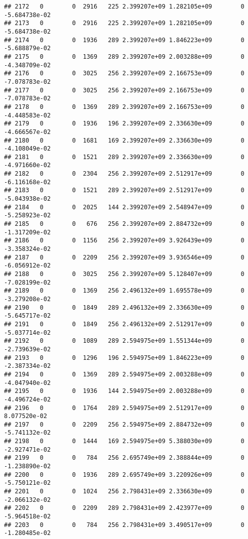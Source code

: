 \documentclass[
]{article}
\begin{document}
\begin{enumerate}
\begin{verbatim}
## 2172   0        0  2916   225 2.399207e+09 1.282105e+09        0 -5.684738e-02
## 2173   0        0  2916   225 2.399207e+09 1.282105e+09        0 -5.684738e-02
## 2174   0        0  1936   289 2.399207e+09 1.846223e+09        0 -5.688879e-02
## 2175   0        0  1369   289 2.399207e+09 2.003288e+09        0 -4.348709e-02
## 2176   0        0  3025   256 2.399207e+09 2.166753e+09        0 -7.078783e-02
## 2177   0        0  3025   256 2.399207e+09 2.166753e+09        0 -7.078783e-02
## 2178   0        0  1369   289 2.399207e+09 2.166753e+09        0 -4.448583e-02
## 2179   0        0  1936   196 2.399207e+09 2.336630e+09        0 -4.666567e-02
## 2180   0        0  1681   169 2.399207e+09 2.336630e+09        0 -4.108049e-02
## 2181   0        0  1521   289 2.399207e+09 2.336630e+09        0 -4.971660e-02
## 2182   0        0  2304   256 2.399207e+09 2.512917e+09        0 -6.116168e-02
## 2183   0        0  1521   289 2.399207e+09 2.512917e+09        0 -5.043938e-02
## 2184   0        0  2025   144 2.399207e+09 2.548947e+09        0 -5.258923e-02
## 2185   0        0   676   256 2.399207e+09 2.884732e+09        0 -1.317209e-02
## 2186   0        0  1156   256 2.399207e+09 3.926439e+09        0 -3.358324e-02
## 2187   0        0  2209   256 2.399207e+09 3.936546e+09        0 -6.056912e-02
## 2188   0        0  3025   256 2.399207e+09 5.128407e+09        0 -7.028199e-02
## 2189   0        0  1369   256 2.496132e+09 1.695578e+09        0 -3.279208e-02
## 2190   0        0  1849   289 2.496132e+09 2.336630e+09        0 -5.645717e-02
## 2191   0        0  1849   256 2.496132e+09 2.512917e+09        0 -5.037714e-02
## 2192   0        0  1089   289 2.594975e+09 1.551344e+09        0 -2.739639e-02
## 2193   0        0  1296   196 2.594975e+09 1.846223e+09        0 -2.387334e-02
## 2194   0        0  1369   289 2.594975e+09 2.003288e+09        0 -4.047940e-02
## 2195   0        0  1936   144 2.594975e+09 2.003288e+09        0 -4.496724e-02
## 2196   0        0  1764   289 2.594975e+09 2.512917e+09        0  8.077520e-02
## 2197   0        0  2209   256 2.594975e+09 2.884732e+09        0 -5.741132e-02
## 2198   0        0  1444   169 2.594975e+09 5.388030e+09        0 -2.927471e-02
## 2199   0        0   784   256 2.695749e+09 2.388844e+09        0 -1.238890e-02
## 2200   0        0  1936   289 2.695749e+09 3.220926e+09        0 -5.750121e-02
## 2201   0        0  1024   256 2.798431e+09 2.336630e+09        0 -2.066132e-02
## 2202   0        0  2209   289 2.798431e+09 2.423977e+09        0 -5.964518e-02
## 2203   0        0   784   256 2.798431e+09 3.490517e+09        0 -1.280485e-02

\end{verbatim}
\end{enumerate}
\end{document}

